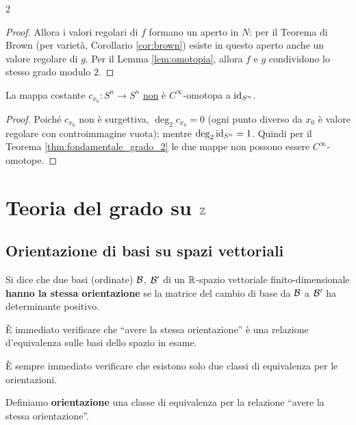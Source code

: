 \begin{multicols*}{2}
\begin{proof}
        Allora i valori regolari di $f$ formano un aperto in $N$: per il Teorema
        di Brown (per varietà, Corollario \ref{cor:brown}) esiste in questo
        aperto anche un valore regolare di $g$. Per il Lemma \ref{lem:omotopia},
        allora $f$ e $g$ condividono lo stesso grado modulo $2$.
    \end{proof}

    \begin{corollary}
        La mappa costante $c_{x_0} : S^n \to S^n$ \underline{non} è
        $C^\infty$-omotopa a $\operatorname{id}_{S^n}$.
    \end{corollary}

    \begin{proof}
        Poiché $c_{x_0}$ non è surgettiva, $\deg_2 c_{x_0} = 0$ (ogni punto diverso da $x_0$ è
        valore regolare con controimmagine vuota); mentre
        $\deg_2 \operatorname{id}_{S^n} = 1$. Quindi per il Teorema \ref{thm:fondamentale_grado_2}
        le due mappe non possono essere $C^\infty$-omotope.
    \end{proof}

    \section{Teoria del grado su \texorpdfstring{$\mathbb{Z}$}{ℤ}}

    \subsection{Orientazione di basi su spazi vettoriali}

    \begin{definition}
        Si dice che due basi (ordinate) $\mathcal{B}$, $\mathcal{B}'$ di un $\mathbb{R}$-spazio vettoriale finito-dimensionale
        \textbf{hanno la stessa orientazione} se la matrice del cambio di base da $\mathcal{B}$
        a $\mathcal{B}'$ ha determinante positivo.
    \end{definition}

    \begin{remark}
        È immediato verificare che ``avere la stessa orientazione'' è
        una relazione d'equivalenza sulle basi dello spazio in esame. \smallskip

        È sempre immediato verificare che esistono solo due classi di equivalenza
        per le orientazioni.
    \end{remark}

    \begin{definition}[Orientazione]
        Definiamo \textbf{orientazione} una classe di equivalenza per la relazione
        ``avere la stessa orientazione''. \smallskip


\end{definition}
\end{multicols*}
